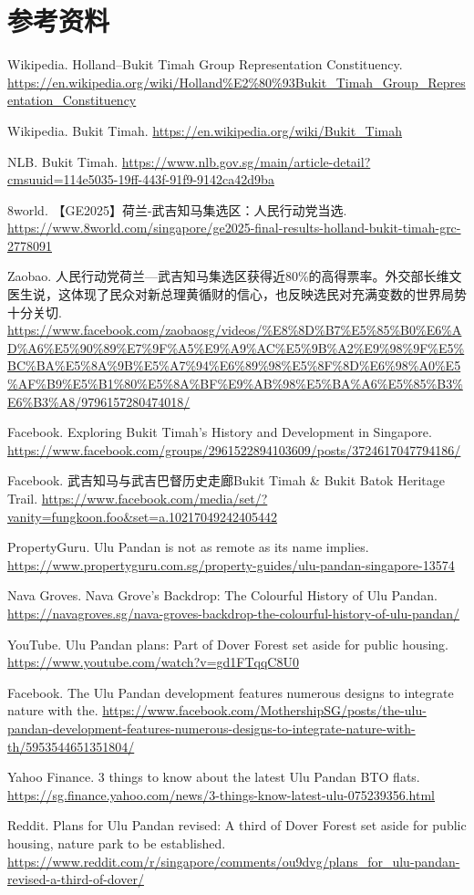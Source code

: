 \documentclass[11pt,a4paper,twoside,openany]{book}
\begin{document}
\section*{参考资料}
\begin{enumerate}[label={[\arabic*]},leftmargin=*,topsep=2pt,itemsep=1pt,parsep=0pt]
  \item Wikipedia. Holland–Bukit Timah Group Representation Constituency. \url{https://en.wikipedia.org/wiki/Holland%E2%80%93Bukit_Timah_Group_Representation_Constituency}
  \item Wikipedia. Bukit Timah. \url{https://en.wikipedia.org/wiki/Bukit_Timah}
  \item NLB. Bukit Timah. \url{https://www.nlb.gov.sg/main/article-detail?cmsuuid=114e5035-19ff-443f-91f9-9142ca42d9ba}
  \item 8world. 【GE2025】荷兰-武吉知马集选区：人民行动党当选. \url{https://www.8world.com/singapore/ge2025-final-results-holland-bukit-timah-grc-2778091}
  \item Zaobao. 人民行动党荷兰—武吉知马集选区获得近80\%的高得票率。外交部长维文医生说，这体现了民众对新总理黄循财的信心，也反映选民对充满变数的世界局势十分关切. \url{https://www.facebook.com/zaobaosg/videos/%E8%8D%B7%E5%85%B0%E6%AD%A6%E5%90%89%E7%9F%A5%E9%A9%AC%E5%9B%A2%E9%98%9F%E5%BC%BA%E5%8A%9B%E5%A7%94%E6%89%98%E5%8F%8D%E6%98%A0%E5%AF%B9%E5%B1%80%E5%8A%BF%E9%AB%98%E5%BA%A6%E5%85%B3%E6%B3%A8/9796157280474018/}
  \item Facebook. Exploring Bukit Timah's History and Development in Singapore. \url{https://www.facebook.com/groups/2961522894103609/posts/3724617047794186/}
  \item Facebook. 武吉知马与武吉巴督历史走廊Bukit Timah \& Bukit Batok Heritage Trail. \url{https://www.facebook.com/media/set/?vanity=fungkoon.foo&set=a.10217049242405442}
  \item PropertyGuru. Ulu Pandan is not as remote as its name implies. \url{https://www.propertyguru.com.sg/property-guides/ulu-pandan-singapore-13574}
  \item Nava Groves. Nava Grove’s Backdrop: The Colourful History of Ulu Pandan. \url{https://navagroves.sg/nava-groves-backdrop-the-colourful-history-of-ulu-pandan/}
  \item YouTube. Ulu Pandan plans: Part of Dover Forest set aside for public housing. \url{https://www.youtube.com/watch?v=gd1FTqqC8U0}
  \item Facebook. The Ulu Pandan development features numerous designs to integrate nature with the. \url{https://www.facebook.com/MothershipSG/posts/the-ulu-pandan-development-features-numerous-designs-to-integrate-nature-with-th/5953544651351804/}
  \item Yahoo Finance. 3 things to know about the latest Ulu Pandan BTO flats. \url{https://sg.finance.yahoo.com/news/3-things-know-latest-ulu-075239356.html}
  \item Reddit. Plans for Ulu Pandan revised: A third of Dover Forest set aside for public housing, nature park to be established. \url{https://www.reddit.com/r/singapore/comments/ou9dvg/plans_for_ulu-pandan-revised-a-third-of-dover/}
\end{enumerate}
\end{document}
